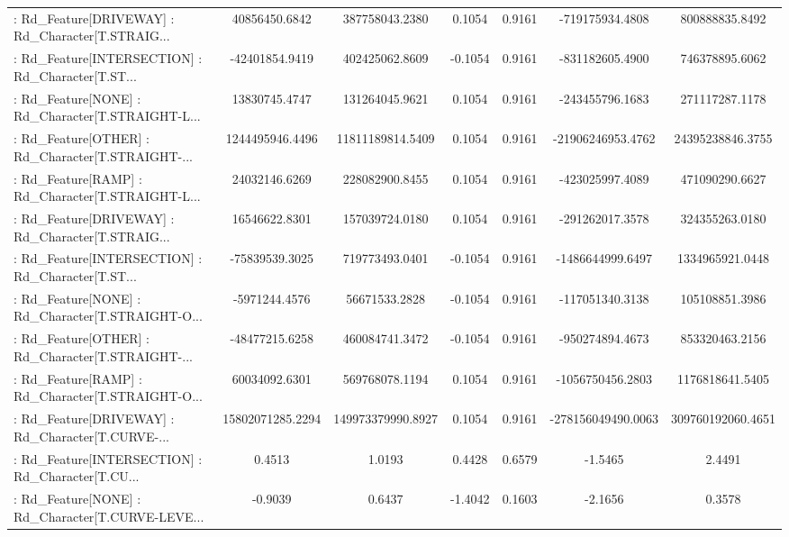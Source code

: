 \begin{longtable}{p{4cm}cccccc}
 : Rd\_Feature[DRIVEWAY] : Rd\_Character[T.STRAIG... &     40856450.6842 &    387758043.2380 &  0.1054 &       0.9161 &    -719175934.4808 &    800888835.8492 \\
 : Rd\_Feature[INTERSECTION] : Rd\_Character[T.ST... &    -42401854.9419 &    402425062.8609 & -0.1054 &       0.9161 &    -831182605.4900 &    746378895.6062 \\
 : Rd\_Feature[NONE] : Rd\_Character[T.STRAIGHT-L... &     13830745.4747 &    131264045.9621 &  0.1054 &       0.9161 &    -243455796.1683 &    271117287.1178 \\
 : Rd\_Feature[OTHER] : Rd\_Character[T.STRAIGHT-... &   1244495946.4496 &  11811189814.5409 &  0.1054 &       0.9161 &  -21906246953.4762 &  24395238846.3755 \\
 : Rd\_Feature[RAMP] : Rd\_Character[T.STRAIGHT-L... &     24032146.6269 &    228082900.8455 &  0.1054 &       0.9161 &    -423025997.4089 &    471090290.6627 \\
 : Rd\_Feature[DRIVEWAY] : Rd\_Character[T.STRAIG... &     16546622.8301 &    157039724.0180 &  0.1054 &       0.9161 &    -291262017.3578 &    324355263.0180 \\
 : Rd\_Feature[INTERSECTION] : Rd\_Character[T.ST... &    -75839539.3025 &    719773493.0401 & -0.1054 &       0.9161 &   -1486644999.6497 &   1334965921.0448 \\
 : Rd\_Feature[NONE] : Rd\_Character[T.STRAIGHT-O... &     -5971244.4576 &     56671533.2828 & -0.1054 &       0.9161 &    -117051340.3138 &    105108851.3986 \\
 : Rd\_Feature[OTHER] : Rd\_Character[T.STRAIGHT-... &    -48477215.6258 &    460084741.3472 & -0.1054 &       0.9161 &    -950274894.4673 &    853320463.2156 \\
 : Rd\_Feature[RAMP] : Rd\_Character[T.STRAIGHT-O... &     60034092.6301 &    569768078.1194 &  0.1054 &       0.9161 &   -1056750456.2803 &   1176818641.5405 \\
 : Rd\_Feature[DRIVEWAY] : Rd\_Character[T.CURVE-... &  15802071285.2294 & 149973379990.8927 &  0.1054 &       0.9161 & -278156049490.0063 & 309760192060.4651 \\
 : Rd\_Feature[INTERSECTION] : Rd\_Character[T.CU... &            0.4513 &            1.0193 &  0.4428 &       0.6579 &            -1.5465 &            2.4491 \\
 : Rd\_Feature[NONE] : Rd\_Character[T.CURVE-LEVE... &           -0.9039 &            0.6437 & -1.4042 &       0.1603 &            -2.1656 &            0.3578 \\

\end{longtable}
